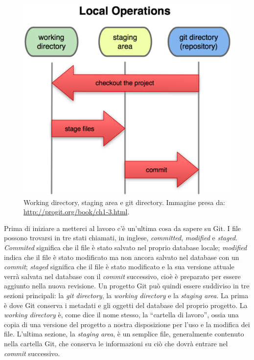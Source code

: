 \documentclass[a4paper,12pt,oneside]{article}
\begin{document}
\begin{figure}
  \centering
  \includegraphics{18333fig0106-tn}
  \caption{Working directory, staging area e git directory. Immagine presa da:
    \url{http://progit.org/book/ch1-3.html}.}
\end{figure}
Prima di iniziare a metterci al lavoro c'è un'ultima cosa da sapere su Git. I
file possono trovarsi in tre stati chiamati, in inglese, \emph{committed},
\emph{modified} e \emph{staged}. \emph{Commited} significa che il file è stato
salvato nel proprio database locale; \emph{modified} indica che il file è stato
modificato ma non ancora salvato nel database con un \emph{commit};
\emph{staged} significa che il file è stato modificato e la sua versione attuale
verrà salvata nel database con il \emph{commit} successivo, cioè è preparato per
essere aggiunto nella nuova revisione. Un progetto Git può quindi essere
suddiviso in tre sezioni principali: la \emph{git directory}, la
\emph{working directory} e la \emph{staging area}. La prima è dove Git conserva
i metadati e gli oggetti del database del proprio progetto. La
\emph{working directory} è, come dice il nome stesso, la ``cartella di lavoro'',
ossia una copia di una versione del progetto a nostra disposizione per l'uso e
la modifica dei file. L'ultima sezione, la \emph{staging area}, è un semplice
file, generalmente contenuto nella cartella Git, che conserva le informazioni su
ciò che dovrà entrare nel \emph{commit} successivo.
\end{document}
